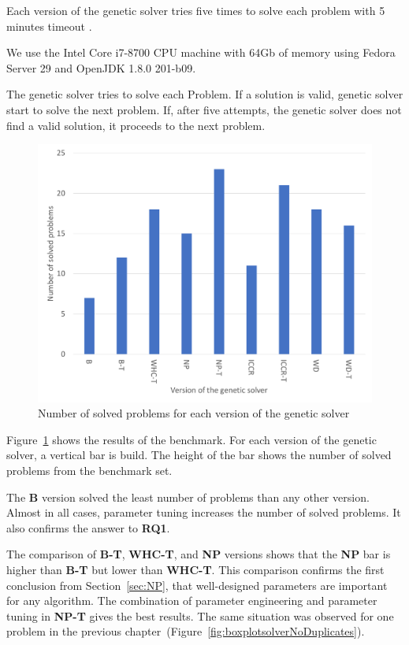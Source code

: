 Each version of the genetic solver tries five times to solve each problem with 5 minutes timeout .

We use the Intel Core i7-8700 CPU machine with 64Gb of memory using Fedora Server 29 and OpenJDK 1.8.0 201-b09.

The genetic solver tries to solve each Problem. If a solution is valid, genetic solver start to solve the next problem. If, after five attempts, the genetic solver does not find a valid solution, it proceeds to the next problem.

\begin{figure}
	\centering
	\includegraphics[width=\textwidth]{images/EvaluationNumberOfSolvedProblems.pdf}
	\caption[Number of problems for each version of the genetic solver]{Number of solved problems for each version of the genetic solver}
	\label{fig:EvaluationNumberOfSolvedProblems}
\end{figure}

Figure~\ref{fig:EvaluationNumberOfSolvedProblems} shows the results of the benchmark. For each version of the genetic solver, a vertical bar is build. The height of the bar shows the number of solved problems from the benchmark set. 

The \textbf{B} version solved the least number of problems than any other version. Almost in all cases, parameter tuning increases the number of solved problems. It also confirms the answer to \textbf{RQ1}. 

The comparison of \textbf{B-T}, \textbf{WHC-T}, and \textbf{NP} versions shows that the \textbf{NP} bar is higher than \textbf{B-T} but lower than \textbf{WHC-T}. This comparison confirms the first conclusion from Section~\ref{sec:NP}, that well-designed parameters are important for any algorithm. The combination of parameter engineering and parameter tuning in \textbf{NP-T} gives the best results. The same situation was observed for one problem in the previous chapter~(Figure~\ref{fig:boxplotsolverNoDuplicates}). 

